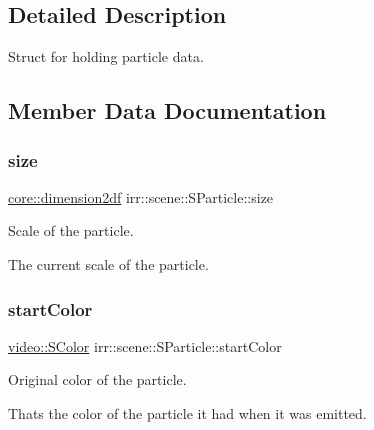 \subsection{Detailed Description}
Struct for holding particle data. 

\subsection{Member Data Documentation}
\mbox{\label{structirr_1_1scene_1_1SParticle_a548dc843e9db5db26e0005a2cb29a609}} 
\subsubsection{\texorpdfstring{size}{size}}
{\footnotesize\ttfamily \hyperlink{namespaceirr_1_1core_af6dc5c45ff13e7712758c827ff58676b}{core\+::dimension2df} irr\+::scene\+::\+S\+Particle\+::size}



Scale of the particle. 

The current scale of the particle. \mbox{\label{structirr_1_1scene_1_1SParticle_a23325221f845c68dd331edb38d90374f}} 
\subsubsection{\texorpdfstring{start\+Color}{startColor}}
{\footnotesize\ttfamily \hyperlink{classirr_1_1video_1_1SColor}{video\+::\+S\+Color} irr\+::scene\+::\+S\+Particle\+::start\+Color}



Original color of the particle. 

That\textquotesingle{}s the color of the particle it had when it was emitted. \mbox{\label{structirr_1_1scene_1_1SParticle_a753df7de54e742cd7d50ff10154906ee}} 

